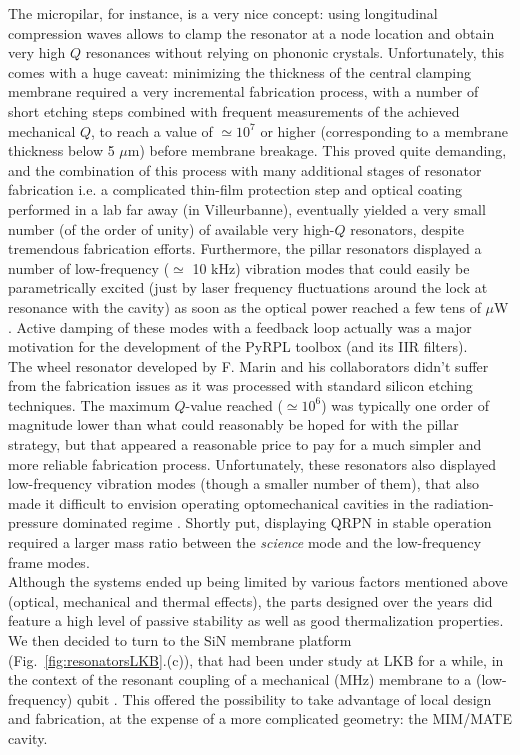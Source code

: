 The micropilar, for instance, is a very nice concept: using longitudinal compression waves allows to clamp the resonator at a node location and obtain very high $Q$ resonances without relying on phononic crystals. Unfortunately, this comes with a huge caveat: minimizing the thickness of the central clamping membrane required a very incremental fabrication process, with a number of short etching steps combined with frequent measurements of the achieved mechanical $Q$, to reach a value of $\simeq 10^7$ or higher (corresponding to a membrane thickness below 5 $\mu$m) before membrane breakage. This proved quite demanding, and the combination of this process with many additional stages of resonator fabrication i.e. a complicated thin-film protection step and optical coating performed in a lab far away (in Villeurbanne), eventually yielded a very small number (of the order of unity) of available very high-$Q$ resonators, despite tremendous fabrication efforts. Furthermore, the pillar resonators displayed a number of low-frequency ($\simeq$ 10 kHz) vibration modes that could easily be parametrically excited (just by laser frequency fluctuations around the lock at resonance with the cavity) as soon as the optical power reached a few tens of $\mu$W \cite{neuhaus}. Active damping of these modes with a feedback loop actually was a major motivation for the development of the PyRPL toolbox (and its IIR filters). \\ 

The wheel resonator developed by F. Marin and his collaborators didn't suffer from the fabrication issues as it was processed with standard silicon etching techniques. The maximum $Q$-value reached ($\simeq 10^6$) was typically one order of magnitude lower than what could reasonably be hoped for with the pillar strategy, but that appeared a reasonable price to pay for a much simpler and more reliable fabrication process. Unfortunately, these resonators also displayed low-frequency vibration modes (though a smaller number of them), that also made it difficult to envision operating optomechanical cavities in the radiation-pressure dominated regime \cite{metzdorff}. Shortly put, displaying QRPN in stable operation required a larger mass ratio between the \textit{science} mode and the low-frequency frame modes. \\ 

Although the systems ended up being limited by various factors mentioned above (optical, mechanical and thermal effects), the parts designed over the years did feature a high level of passive stability as well as good thermalization properties. We then decided to turn to the SiN membrane platform (Fig.~\ref{fig:resonatorsLKB}.(c)), that had been under study at LKB for a while, in the context of the resonant coupling of a mechanical (MHz) membrane to a (low-frequency) qubit \cite{gerashchenko2025probingquantummotionmacroscopic}. This offered the possibility to take advantage of local design and fabrication, at the expense of a more complicated geometry: the MIM/MATE cavity. \\ 

